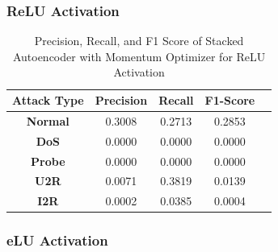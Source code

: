 \documentclass[12pt, a4paper]{report}
\begin{document}
\subsubsection{ReLU Activation}
\begin{table}[ht]
\centering
\captionsetup{justification=centering,margin=2cm}
\begin{tabular}{|c|c|c|c|c|}
\hline
\multicolumn{1}{|c|}{\textbf{Attack Type}} & \multicolumn{1}{c|}{\textbf{Precision}} & \multicolumn{1}{c|}{\textbf{Recall}} & \multicolumn{1}{c|}{\textbf{F1-Score}} \\ \hline
\textbf{Normal}        & 0.3008                                   & 0.2713                                & 0.2853                                                                  \\ \hline
\textbf{DoS}           & 0.0000                                  & 0.0000                                &  0.0000                                                                    \\ \hline
\textbf{Probe}         & 0.0000                                  & 0.0000                                & 0.0000                                                                  \\ \hline
\textbf{U2R}           & 0.0071                                    & 0.3819                                & 0.0139                                                                   \\ \hline
\textbf{I2R}           & 0.0002                                      & 0.0385                                   & 0.0004                                                            \\ \hline         \end{tabular}
\caption{Precision, Recall, and F1 Score of Stacked Autoencoder with Momentum Optimizer for ReLU Activation}
\label{prf1_mom_relu_auto}
\end{table}

\subsubsection{eLU Activation}
\end{document}
